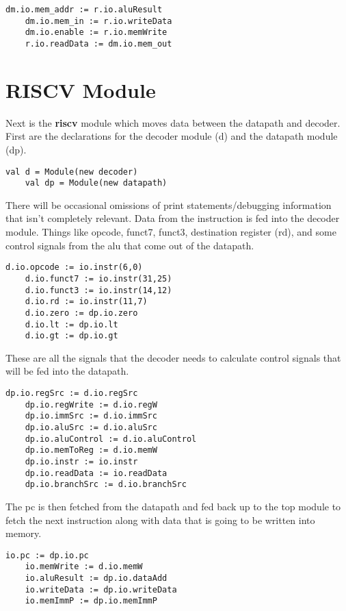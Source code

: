 \documentclass[12pt, letterpaper]{report}
\begin{document}
\begin{lstlisting}[style=scala]
    dm.io.mem_addr := r.io.aluResult
    dm.io.mem_in := r.io.writeData
    dm.io.enable := r.io.memWrite
    r.io.readData := dm.io.mem_out
\end{lstlisting}




\section{RISCV Module}
Next is the \textbf{riscv} module which moves data between the datapath and decoder. First are the declarations for the decoder module (d) and the datapath module (dp).

\begin{lstlisting}[style=scala]
    val d = Module(new decoder)
    val dp = Module(new datapath)
\end{lstlisting}

There will be occasional omissions of print statements/debugging information that isn't completely relevant.
Data from the instruction is fed into the decoder module. Things like opcode, funct7, funct3, destination register (rd), 
and some control signals from the alu that come out of the datapath.

\begin{lstlisting}[style=scala]
    d.io.opcode := io.instr(6,0)
    d.io.funct7 := io.instr(31,25)
    d.io.funct3 := io.instr(14,12)
    d.io.rd := io.instr(11,7)
    d.io.zero := dp.io.zero
    d.io.lt := dp.io.lt
    d.io.gt := dp.io.gt
\end{lstlisting}

These are all the signals that the decoder needs to calculate control signals that will be fed into the datapath.

\begin{lstlisting}[style=scala]
    dp.io.regSrc := d.io.regSrc
    dp.io.regWrite := d.io.regW
    dp.io.immSrc := d.io.immSrc
    dp.io.aluSrc := d.io.aluSrc
    dp.io.aluControl := d.io.aluControl
    dp.io.memToReg := d.io.memW
    dp.io.instr := io.instr
    dp.io.readData := io.readData
    dp.io.branchSrc := d.io.branchSrc
\end{lstlisting}

The pc is then fetched from the datapath and fed back up to the top module to fetch the next instruction along with data
that is going to be written into memory.

\begin{lstlisting}[style=scala]
    io.pc := dp.io.pc
    io.memWrite := d.io.memW
    io.aluResult := dp.io.dataAdd
    io.writeData := dp.io.writeData
    io.memImmP := dp.io.memImmP
\end{lstlisting}
\end{document}
